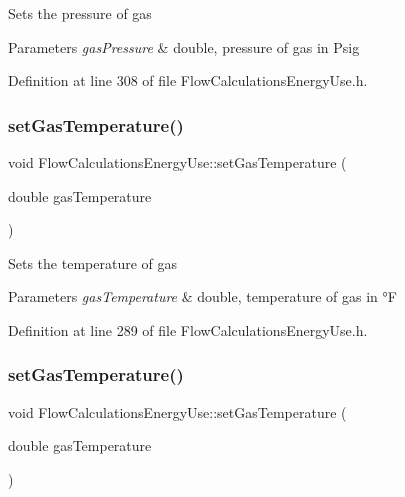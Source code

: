 Sets the pressure of gas


\begin{DoxyParams}{Parameters}
{\em gas\+Pressure} & double, pressure of gas in Psig \\
\hline
\end{DoxyParams}


Definition at line 308 of file Flow\+Calculations\+Energy\+Use.\+h.

\mbox{\label{class_flow_calculations_energy_use_a80db5465d8a0354da31a7f90c759ea1f}} 
\subsubsection{\texorpdfstring{set\+Gas\+Temperature()}{setGasTemperature()}\hspace{0.1cm}{\footnotesize\ttfamily [1/3]}}
{\footnotesize\ttfamily void Flow\+Calculations\+Energy\+Use\+::set\+Gas\+Temperature (\begin{DoxyParamCaption}\item[{double}]{gas\+Temperature }\end{DoxyParamCaption})\hspace{0.3cm}{\ttfamily [inline]}}

Sets the temperature of gas


\begin{DoxyParams}{Parameters}
{\em gas\+Temperature} & double, temperature of gas in °F \\
\hline
\end{DoxyParams}


Definition at line 289 of file Flow\+Calculations\+Energy\+Use.\+h.

\mbox{\label{class_flow_calculations_energy_use_a80db5465d8a0354da31a7f90c759ea1f}} 
\subsubsection{\texorpdfstring{set\+Gas\+Temperature()}{setGasTemperature()}\hspace{0.1cm}{\footnotesize\ttfamily [2/3]}}
{\footnotesize\ttfamily void Flow\+Calculations\+Energy\+Use\+::set\+Gas\+Temperature (\begin{DoxyParamCaption}\item[{double}]{gas\+Temperature }\end{DoxyParamCaption})\hspace{0.3cm}{\ttfamily [inline]}}

